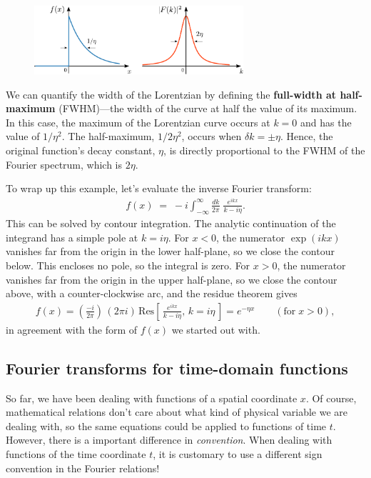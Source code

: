 \documentclass[10pt,a4paper]{article}
\begin{document}
\begin{figure}[h]
  \centering\includegraphics[width=0.69\textwidth]{fourier_example1}
\end{figure}

We can quantify the width of the Lorentzian by defining the
\textbf{full-width at half-maximum} (FWHM)---the width of the curve at
half the value of its maximum.  In this case, the maximum of the
Lorentzian curve occurs at $k=0$ and has the value of $1/\eta^2$.  The
half-maximum, $1/2\eta^2$, occurs when $\delta k = \pm \eta$.  Hence,
the original function's decay constant, $\eta$, is directly
proportional to the FWHM of the Fourier spectrum, which is $2\eta$.

To wrap up this example, let's evaluate the inverse Fourier transform:
\begin{align}
  f(x) \; = \; -i\int_{-\infty}^\infty \frac{dk}{2\pi} \; \frac{e^{i kx}}{k-i\eta}.
\end{align}
This can be solved by contour integration.  The analytic continuation
of the integrand has a simple pole at $k = i\eta$.  For $x < 0$, the
numerator $\exp(ikx)$ vanishes far from the origin in the lower
half-plane, so we close the contour below.  This encloses no pole, so
the integral is zero.  For $x > 0$, the numerator vanishes far from
the origin in the upper half-plane, so we close the contour above,
with a counter-clockwise arc, and the residue theorem gives
\begin{align}
  f(x) = \left(\frac{-i}{2\pi}\right) \, \left(2\pi i\right) \, \mathrm{Res}\left[\, \frac{e^{ikx}}{k-i\eta}, \, k=i\eta\, \right] = e^{-\eta x} \qquad(\mathrm{for}\; x > 0),
\end{align}
in agreement with the form of $f(x)$ we started out with.

\subsection{Fourier transforms for time-domain functions}
\label{fourier-time}

So far, we have been dealing with functions of a spatial coordinate
$x$.  Of course, mathematical relations don't care about what kind of
physical variable we are dealing with, so the same equations could be
applied to functions of time $t$. However, there is a important
difference in \textit{convention}.  When dealing with functions of the
time coordinate $t$, it is customary to use a different sign
convention in the Fourier relations!
\end{document}
